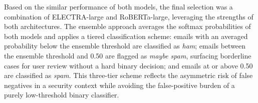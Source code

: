 Based on the similar performance of both models, the final selection was a combination of \acs{ELECTRA}-large and \acs{RoBERTa}-large, leveraging the strengths of both architectures. The ensemble approach averages the softmax probabilities of both models and applies a tiered classification scheme: emails with an averaged probability below the ensemble threshold are classified as \textit{ham}; emails between the ensemble threshold and 0.50 are flagged as \textit{maybe spam}, surfacing borderline cases for user review without a hard binary decision; and emails at or above 0.50 are classified as \textit{spam}. This three-tier scheme reflects the asymmetric risk of false negatives in a security context while avoiding the false-positive burden of a purely low-threshold binary classifier.